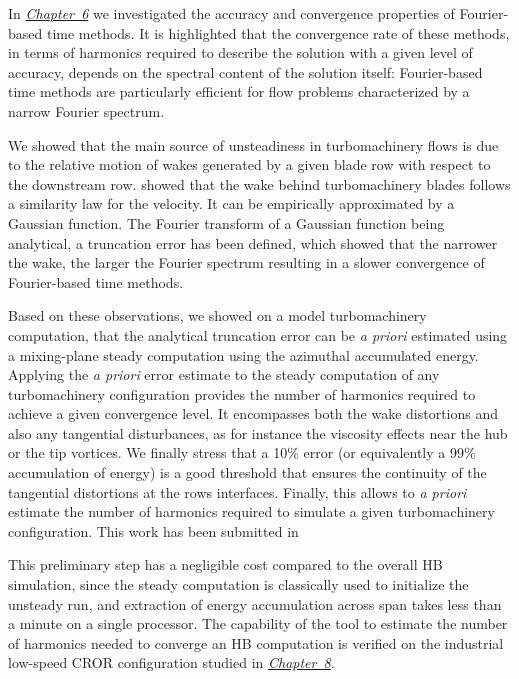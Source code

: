 In \hyperref[cha:limitations_convergence]{\emph{Chapter~6}}
we investigated the accuracy and convergence properties 
of Fourier-based time methods. It is highlighted that the convergence rate 
of these methods, in terms of harmonics required to describe the solution 
with a given level of accuracy, depends on the spectral content of the 
solution itself: Fourier-based time methods are particularly efficient 
for flow problems characterized by a narrow Fourier 
spectrum. 

We showed that the main source of unsteadiness in 
turbomachinery flows is due to the relative motion of wakes 
generated by a given blade row with respect to the downstream row.
\citet{Lakshminarayana1980} showed that the wake
behind turbomachinery blades follows a similarity law for the velocity. 
It can be empirically approximated by a Gaussian function.
The Fourier transform of a Gaussian function being analytical,
a truncation error has been defined, which showed that the narrower the wake, 
the larger the Fourier spectrum resulting in a slower convergence 
of Fourier-based time methods.

Based on these observations,
we showed on a model turbomachinery computation, that
the analytical truncation error can be \emph{a priori} 
estimated using a mixing-plane steady computation
using the azimuthal accumulated energy.
Applying the \emph{a priori} error estimate to 
the steady computation of any turbomachinery configuration
provides the number of harmonics required 
to achieve a given convergence level.
It encompasses both the wake distortions and also
any tangential disturbances, as for instance
the viscosity effects near the hub or the tip vortices.
We finally stress that a 10\% error (or equivalently 
a 99\% accumulation of energy) is a good threshold
that ensures the continuity of the tangential distortions at the rows
interfaces. Finally, this allows to \emph{a priori}
estimate the number of harmonics required to simulate
a given turbomachinery configuration.
This work has been submitted in
\begin{quote}
\end{quote}

This preliminary step has a negligible cost compared to the overall HB
simulation, since the steady computation is classically used to initialize 
the unsteady run, and extraction of energy accumulation across span takes 
less than a minute on a single processor. The capability of the
tool to estimate the number of harmonics needed
to converge an HB computation is verified on the industrial low-speed CROR configuration
studied in \hyperref[cha:dream_ls_isolated]{\emph{Chapter~8}}.

